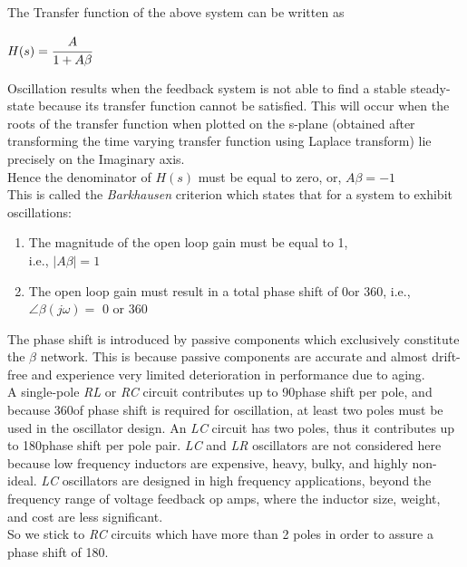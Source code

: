 \documentclass[12pt]{report}
\begin{document}
\begin{large}
The Transfer function of the above system can be written as
\begin{center}
$H(s) = \cfrac{A}{1+A\beta}$\\
\end{center}

Oscillation results when the feedback system is not able to find a stable steady-state because its transfer function cannot be satisfied. This will occur when the roots of the transfer function when plotted on the s-plane (obtained after transforming the time varying transfer function using Laplace transform) lie precisely on the Imaginary axis.\\

Hence the denominator of $H(s)$ must be equal to zero, or, $A\beta = -1$\\

This is called the \textit{Barkhausen} criterion which states that for a system to exhibit oscillations:
\begin{enumerate}
  \item The magnitude of the open loop gain must be equal to 1,\\i.e., $|A\beta| = 1$
  \item The open loop gain must result in a total phase shift of 0\degree or 360\degree, i.e., $\angle\beta(j\omega) =$ 0 or 360
\end{enumerate}

The phase shift is introduced by passive components which exclusively constitute the $\beta$ network. This is because passive components are accurate and almost drift-free and experience very limited deterioration in performance due to aging.\\

A single-pole \textit{RL} or \textit{RC} circuit contributes up to 90\degree phase shift per pole, and because 360\degree of phase shift is required for oscillation, at least two poles must be used in the oscillator design. An \textit{LC} circuit has two poles, thus it contributes up to 180\degree phase shift per pole pair. \textit{LC} and \textit{LR} oscillators are not considered here because low frequency inductors are expensive, heavy, bulky, and highly non-ideal. \textit{LC} oscillators are designed in high frequency applications, beyond the frequency range of voltage feedback op amps, where the inductor size, weight, and cost are less significant. \cite{ti}\\

So we stick to \textit{RC} circuits which have more than 2 poles in order to assure a phase shift of 180\degree.\\


\end{large}
\end{document}
